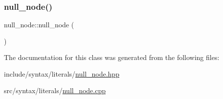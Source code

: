 \subsubsection{\texorpdfstring{null\+\_\+node()}{null\_node()}}
{\footnotesize\ttfamily null\+\_\+node\+::null\+\_\+node (\begin{DoxyParamCaption}{ }\end{DoxyParamCaption})}



The documentation for this class was generated from the following files\+:\begin{DoxyCompactItemize}
\item 
include/syntax/literals/\hyperlink{null__node_8hpp}{null\+\_\+node.\+hpp}\item 
src/syntax/literals/\hyperlink{null__node_8cpp}{null\+\_\+node.\+cpp}\end{DoxyCompactItemize}
